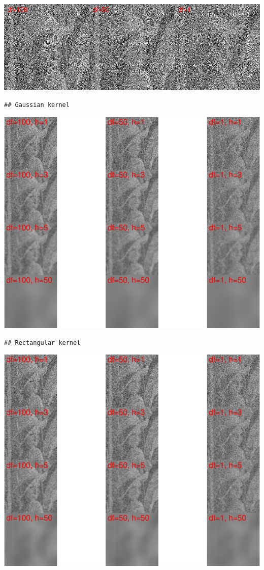 \documentclass[10pt,]{article}
\begin{document}
\includegraphics{project2_files/figure-latex/Nadaraya-Watson-estimator non-Gaussian Noise Lena-1.pdf}

\begin{verbatim}
## Gaussian kernel
\end{verbatim}

\includegraphics{project2_files/figure-latex/Nadaraya-Watson-estimator non-Gaussian Noise Lena-2.pdf}

\begin{verbatim}
## Rectangular kernel
\end{verbatim}

\includegraphics{project2_files/figure-latex/Nadaraya-Watson-estimator non-Gaussian Noise Lena-3.pdf}
\end{document}
